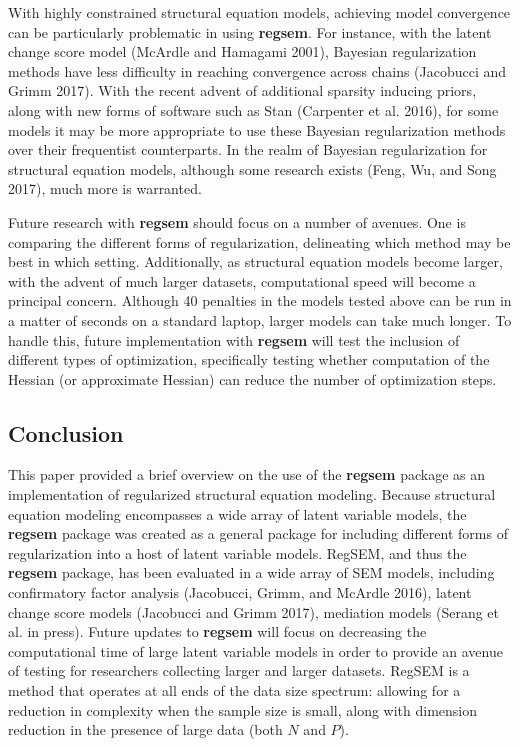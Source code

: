 With highly constrained structural equation models, achieving model
convergence can be particularly problematic in using \textbf{regsem}.
For instance, with the latent change score model (McArdle and Hamagami
2001), Bayesian regularization methods have less difficulty in reaching
convergence across chains (Jacobucci and Grimm 2017). With the recent
advent of additional sparsity inducing priors, along with new forms of
software such as Stan (Carpenter et al. 2016), for some models it may be
more appropriate to use these Bayesian regularization methods over their
frequentist counterparts. In the realm of Bayesian regularization for
structural equation models, although some research exists (Feng, Wu, and
Song 2017), much more is warranted.

Future research with \textbf{regsem} should focus on a number of
avenues. One is comparing the different forms of regularization,
delineating which method may be best in which setting. Additionally, as
structural equation models become larger, with the advent of much larger
datasets, computational speed will become a principal concern. Although
40 penalties in the models tested above can be run in a matter of
seconds on a standard laptop, larger models can take much longer. To
handle this, future implementation with \textbf{regsem} will test the
inclusion of different types of optimization, specifically testing
whether computation of the Hessian (or approximate Hessian) can reduce
the number of optimization steps.

\subsection{Conclusion}\label{conclusion}

This paper provided a brief overview on the use of the \textbf{regsem}
package as an implementation of regularized structural equation
modeling. Because structural equation modeling encompasses a wide array
of latent variable models, the \textbf{regsem} package was created as a
general package for including different forms of regularization into a
host of latent variable models. RegSEM, and thus the \textbf{regsem}
package, has been evaluated in a wide array of SEM models, including
confirmatory factor analysis (Jacobucci, Grimm, and McArdle 2016),
latent change score models (Jacobucci and Grimm 2017), mediation models
(Serang et al. in press). Future updates to \textbf{regsem} will focus
on decreasing the computational time of large latent variable models in
order to provide an avenue of testing for researchers collecting larger
and larger datasets. RegSEM is a method that operates at all ends of the
data size spectrum: allowing for a reduction in complexity when the
sample size is small, along with dimension reduction in the presence of
large data (both \(N\) and \(P\)).

